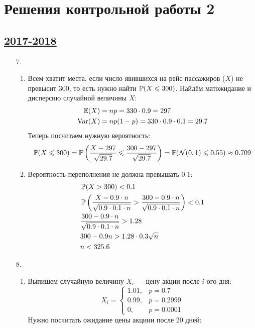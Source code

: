 \thispagestyle{empty}
\section{Решения контрольной работы 2}

\subsection[2017-2018]{\hyperref[sec:kr_02_2017_2018]{2017-2018}}
\label{sec:sol_kr_02_2017_2018}

\begin{enumerate}
\item[7.]
\begin{enumerate}
\item Всем хватит места, если число явившихся на рейс пассажиров ($X$) не превысит $300$,
то есть нужно найти $\P(X \leq 300)$. Найдём матожидание и дисперсию
случайной величины $X$:
\begin{align*}
\E(X) &= np = 330 \cdot 0.9 = 297 \\
\Var(X) &= np(1-p) = 330 \cdot 0.9 \cdot 0.1 = 29.7
\end{align*}
Теперь посчитаем нужную вероятность:
\[
\P(X \leq 300) = \P \left(\frac{X - 297}{\sqrt{29.7}} \leq \frac{300 - 297}{\sqrt{29.7}} \right) = \P(\cN(0,1) \leq 0.55) \approx 0.709
\]
\item Вероятность переполнения не должна превышать $0.1$:
\begin{align*}
&\P(X > 300) < 0.1 \\
&\P\left(\frac{X - 0.9 \cdot n}{\sqrt{0.9 \cdot 0.1 \cdot n}} > \frac{300 - 0.9 \cdot n}{\sqrt{0.9 \cdot 0.1 \cdot n}} \right) < 0.1 \\
&\frac{300 - 0.9 \cdot n}{\sqrt{0.9 \cdot 0.1 \cdot n}}  > 1.28 \\
&300 - 0.9n > 1.28 \cdot 0.3 \sqrt{n} \\
&n < 325.6
\end{align*}
\end{enumerate}
\item[8.]
\begin{enumerate}
\item Выпишем случайную величину $X_i$ — цену акции после $i$-ого дня:
\[
X_i =
\begin{cases}
1.01, & p = 0.7 \\
0.99, & p = 0.2999 \\
0, & p = 0.0001
\end{cases}
\]
Нужно посчитать ожидание цены акциии после 20 дней:

\end{enumerate}
\end{enumerate}
